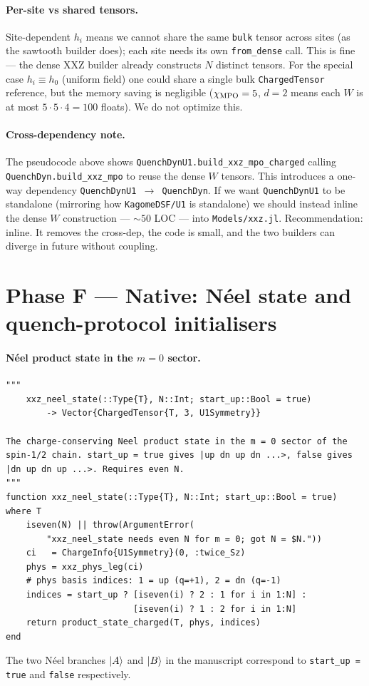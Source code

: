 \documentclass[11pt]{article}
\begin{document}
\paragraph{Per-site vs shared tensors.}  Site-dependent $h_i$ means we
cannot share the same \texttt{bulk} tensor across sites (as the sawtooth
builder does); each site needs its own \texttt{from\_dense} call.  This is
fine --- the dense XXZ builder already constructs $N$ distinct tensors.  For
the special case $h_i \equiv h_0$ (uniform field) one could share a single
bulk \texttt{ChargedTensor} reference, but the memory saving is negligible
($\chi_{\rm MPO}=5$, $d=2$ means each $W$ is at most $5 \cdot 5 \cdot 4 = 100$
floats).  We do not optimize this.

\paragraph{Cross-dependency note.}  The pseudocode above shows \texttt{QuenchDynU1.build\_xxz\_mpo\_charged}
calling \texttt{QuenchDyn.build\_xxz\_mpo} to reuse the dense $W$ tensors.
This introduces a one-way dependency \texttt{QuenchDynU1 $\to$ QuenchDyn}.
If we want \texttt{QuenchDynU1} to be standalone (mirroring how
\texttt{KagomeDSF/U1} is standalone) we should instead inline the
dense $W$ construction --- $\sim 50$ LOC --- into \texttt{Models/xxz.jl}.
Recommendation: inline.  It removes the cross-dep, the code is small, and the
two builders can diverge in future without coupling.

\section{Phase F --- Native: N\'eel state and quench-protocol initialisers}
\label{sec:phase-f}

\paragraph{N\'eel product state in the $m=0$ sector.}
\begin{lstlisting}
"""
    xxz_neel_state(::Type{T}, N::Int; start_up::Bool = true)
        -> Vector{ChargedTensor{T, 3, U1Symmetry}}

The charge-conserving Neel product state in the m = 0 sector of the
spin-1/2 chain. start_up = true gives |up dn up dn ...>, false gives
|dn up dn up ...>. Requires even N.
"""
function xxz_neel_state(::Type{T}, N::Int; start_up::Bool = true) where T
    iseven(N) || throw(ArgumentError(
        "xxz_neel_state needs even N for m = 0; got N = $N."))
    ci   = ChargeInfo{U1Symmetry}(0, :twice_Sz)
    phys = xxz_phys_leg(ci)
    # phys basis indices: 1 = up (q=+1), 2 = dn (q=-1)
    indices = start_up ? [iseven(i) ? 2 : 1 for i in 1:N] :
                         [iseven(i) ? 1 : 2 for i in 1:N]
    return product_state_charged(T, phys, indices)
end
\end{lstlisting}
The two N\'eel branches $\ket{A}$ and $\ket{B}$ in the manuscript correspond
to \texttt{start\_up = true} and \texttt{false} respectively.
\end{document}
